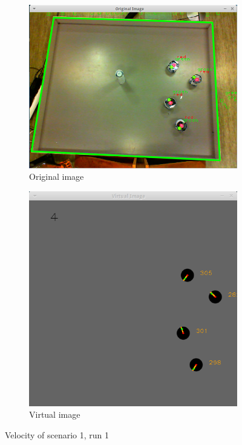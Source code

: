 \begin{figure}[H]
    \centering
    \begin{subfigure}[b]{0.55\textwidth}
        \centering
        \includegraphics[width=\textwidth]{figs/camOrig}
        \caption{Original image}
        \label{fig:camorig}
    \end{subfigure}
    \hfill
    \begin{subfigure}[b]{0.4\textwidth}
        \centering
        \includegraphics[width=\textwidth]{figs/camVirt}
        \caption{Virtual image}
        \label{fig:camvirt}
    \end{subfigure}
    \caption[Velocity]{Velocity of scenario 1, run 1}
    \label{fig:cam}
\end{figure}

